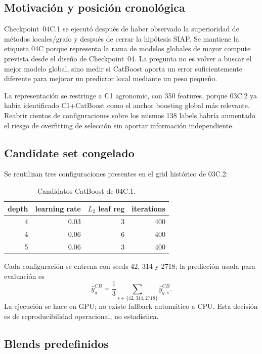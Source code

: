 \subsection{Motivación y posición cronológica}

Checkpoint~04C.1 se ejecutó después de haber observado la superioridad de métodos
locales/grafo y después de cerrar la hipótesis SIAP. Se mantiene la etiqueta 04C porque
representa la rama de modelos globales de mayor compute prevista desde el diseño de
Checkpoint~04. La pregunta no es volver a buscar el mejor modelo global, sino medir si
CatBoost aporta un error suficientemente diferente para mejorar un predictor local mediante
un peso pequeño.

La representación se restringe a C1 agronomic, con 350 features, porque 03C.2 ya había
identificado C1+CatBoost como el anchor boosting global más relevante. Reabrir cientos de
configuraciones sobre los mismos 138 labels habría aumentado el riesgo de overfitting de
selección sin aportar información independiente.

\subsection{Candidate set congelado}

Se reutilizan tres configuraciones presentes en el grid histórico de 03C.2:
\begin{table}[H]
\centering
\caption{Candidatos CatBoost de 04C.1.}
\label{tab:cp04c-cat}
\begin{tabular}{rrrr}
\toprule
depth & learning rate & $L_2$ leaf reg & iterations \\
\midrule
4 & 0.03 & 3 & 400 \\
4 & 0.06 & 6 & 400 \\
5 & 0.06 & 3 & 400 \\
\bottomrule
\end{tabular}
\end{table}

Cada configuración se entrena con seeds 42, 314 y 2718; la predicción usada para evaluación
es
\[
\hat y_q^{CB}
=
\frac{1}{3}
\sum_{s\in\{42,314,2718\}}
\hat y_{q,s}^{CB}.
\]
La ejecución se hace en GPU; no existe fallback automático a CPU. Esta decisión es de
reproducibilidad operacional, no estadística.

\subsection{Blends predefinidos}

